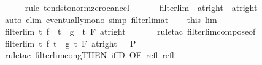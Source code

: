 \begin{isabellebody}
\ \ \ \ \isamarkupfalse%
\ {\isacharparenleft}{\kern0pt}rule\ tendsto{\isacharunderscore}{\kern0pt}norm{\isacharunderscore}{\kern0pt}zero{\isacharunderscore}{\kern0pt}cancel{\isacharparenright}{\kern0pt}\isanewline
\ \ \isamarkupfalse%
\ {\isasymzeta}\ \isamarkupfalse%
\ {\isachardoublequoteopen}filterlim\ {\isasymzeta}\ {\isacharparenleft}{\kern0pt}at{\isacharunderscore}{\kern0pt}right\ {}{\isacharparenright}{\kern0pt}\ {\isacharparenleft}{\kern0pt}at{\isacharunderscore}{\kern0pt}right\ {}{\isacharparenright}{\kern0pt}{\isachardoublequoteclose}\isanewline
\ \ \ \ \isamarkupfalse%
\ {\isacharparenleft}{\kern0pt}auto\ elim{\isacharbang}{\kern0pt}{\isacharcolon}{\kern0pt}\ eventually{\isacharunderscore}{\kern0pt}mono\ simp{\isacharcolon}{\kern0pt}\ filterlim{\isacharunderscore}{\kern0pt}at{\isacharparenright}{\kern0pt}\isanewline
\ \ \isamarkupfalse%
\ this\ lim\ \isamarkupfalse%
\ {\isachardoublequoteopen}filterlim\ {\isacharparenleft}{\kern0pt}{\isasymlambda}t{\isachardot}{\kern0pt}\ f{\isacharprime}{\kern0pt}\ {\isacharparenleft}{\kern0pt}{\isasymzeta}\ t{\isacharparenright}{\kern0pt}\ {\isacharslash}{\kern0pt}\ g{\isacharprime}{\kern0pt}\ {\isacharparenleft}{\kern0pt}{\isasymzeta}\ t{\isacharparenright}{\kern0pt}{\isacharparenright}{\kern0pt}\ F\ {\isacharparenleft}{\kern0pt}at{\isacharunderscore}{\kern0pt}right\ {}{\isacharparenright}{\kern0pt}{\isachardoublequoteclose}\isanewline
\ \ \ \ \isamarkupfalse%
\ {\isacharparenleft}{\kern0pt}rule{\isacharunderscore}{\kern0pt}tac\ filterlim{\isacharunderscore}{\kern0pt}compose{\isacharbrackleft}{\kern0pt}of\ {\isacharunderscore}{\kern0pt}\ {\isacharunderscore}{\kern0pt}\ {\isacharunderscore}{\kern0pt}\ {\isasymzeta}{\isacharbrackright}{\kern0pt}{\isacharparenright}{\kern0pt}\isanewline
\ \ \isamarkupfalse%
\ \isamarkupfalse%
\ {\isachardoublequoteopen}filterlim\ {\isacharparenleft}{\kern0pt}{\isasymlambda}t{\isachardot}{\kern0pt}\ f\ t\ {\isacharslash}{\kern0pt}\ g\ t{\isacharparenright}{\kern0pt}\ F\ {\isacharparenleft}{\kern0pt}at{\isacharunderscore}{\kern0pt}right\ {}{\isacharparenright}{\kern0pt}{\isachardoublequoteclose}\ {\isacharparenleft}{\kern0pt}\ {\isacharquery}{\kern0pt}P{\isacharparenright}{\kern0pt}\isanewline
\ \ \ \ \isamarkupfalse%
\ {\isacharparenleft}{\kern0pt}rule{\isacharunderscore}{\kern0pt}tac\ filterlim{\isacharunderscore}{\kern0pt}cong{\isacharbrackleft}{\kern0pt}THEN\ iffD{}{\isacharcomma}{\kern0pt}\ OF\ refl\ refl{\isacharbrackright}{\kern0pt}{\isacharparenright}{\kern0pt}\isanewline

\end{isabellebody}
